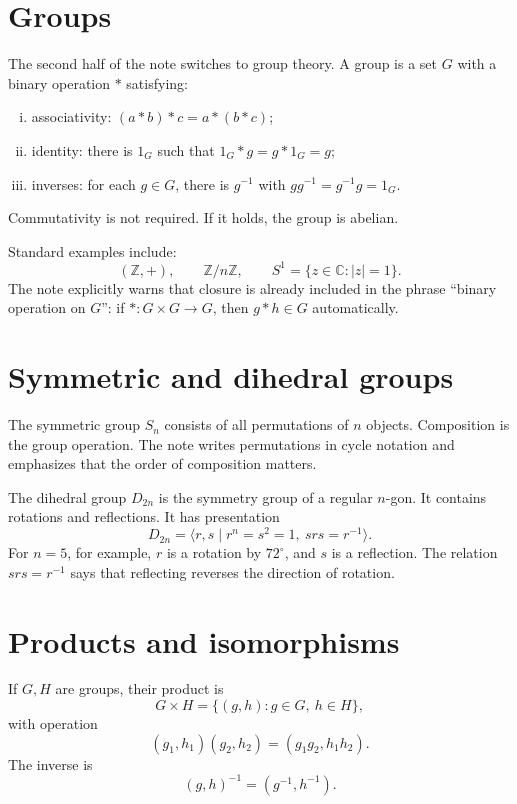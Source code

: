 \section{Groups}

The second half of the note switches to group theory.  A group is a set \(G\) with a binary operation \(*\) satisfying:
\begin{enumerate}[(i)]
  \item associativity: \((a*b)*c=a*(b*c)\);
  \item identity: there is \(1_G\) such that \(1_G*g=g*1_G=g\);
  \item inverses: for each \(g\in G\), there is \(g^{-1}\) with \(gg^{-1}=g^{-1}g=1_G\).

\end{enumerate}
Commutativity is not required.  If it holds, the group is abelian.

Standard examples include:
\[
  (\mathbb Z,+),\qquad \mathbb Z/n\mathbb Z,\qquad S^1=\{z\in\mathbb C:|z|=1\}.
\]
The note explicitly warns that closure is already included in the phrase ``binary operation on \(G\)'': if \(*:G\times G\to G\), then \(g*h\in G\) automatically.

\section{Symmetric and dihedral groups}

The symmetric group \(S_n\) consists of all permutations of \(n\) objects.  Composition is the group operation.  The note writes permutations in cycle notation and emphasizes that the order of composition matters.

The dihedral group \(D_{2n}\) is the symmetry group of a regular \(n\)-gon.  It contains rotations and reflections.  It has presentation
\[
  D_{2n}=\langle r,s\mid r^n=s^2=1,\ srs=r^{-1}\rangle.
\]
For \(n=5\), for example, \(r\) is a rotation by \(72^\circ\), and \(s\) is a reflection.  The relation \(srs=r^{-1}\) says that reflecting reverses the direction of rotation.

\section{Products and isomorphisms}

If \(G,H\) are groups, their product is
\[
  G\times H=\{(g,h):g\in G,\ h\in H\},
\]
with operation
\[
  (g_1,h_1)(g_2,h_2)=(g_1g_2,h_1h_2).
\]
The inverse is
\[
  (g,h)^{-1}=(g^{-1},h^{-1}).
\]

